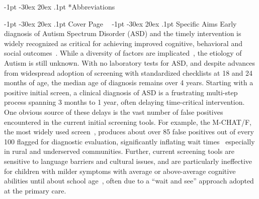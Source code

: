 \documentclass[onecolumn, compsoc,11pt]{IEEEtran}
\makeatletter
\renewcommand\section{\@startsection {section}{1}{\z@}%
                                   {-1pt \@plus -30ex \@minus 20ex}%
                                   {.1pt}%
                                   {\large\bfseries\scshape}}
\makeatother
\begin{document}


\vspace{20pt}


\section*{Abbreviations}

\section{Cover Page}
\clearpage
$\phantom{x}$
\vspace{-35pt}  
\section{Specific Aims}
Early diagnosis of Autism Spectrum Disorder (ASD) and the timely  intervention is widely recognized as critical for achieving improved cognitive, behavioral and social outcomes~\cite{hyman2020identification}.
While a diversity of factors are implicated~\cite{kalb2012determinants,bisgaier2011access,fenikile2015barriers,pmid27565363}, the etiology of Autism is still unknown. With no laboratory tests for ASD, and despite advances from widespread adoption of screening with standardized checklists at 18 and 24 months of age, the median age of diagnosis remains over 4 years.  Starting with a positive initial screen, a clinical diagnosis of ASD is  a  frustrating multi-step process spanning 3 months to 1 year, often delaying  time-critical intervention. One obvious source of these delays  is the vast number of false positives encountered in the current initial  screening tools. For example, the  M-CHAT/F, the most widely used  screen~\cite{robins2014validation,hyman2020identification},  produces about   over 85 false positives out of every 100   flagged for  diagnostic evaluation, significantly inflating wait times~\cite{pmid27565363} especially in rural and underserved communities.
Further, current  screening tools are sensitive to language barriers and cultural issues, and are  particularly ineffective for children with milder symptoms  with average or above-average cognitive abilities until about school age~\cite{jashar2016cognitive,hyman2020identification}, often due to a ``wait and see'' approach adopted at the primary care.
\end{document}
